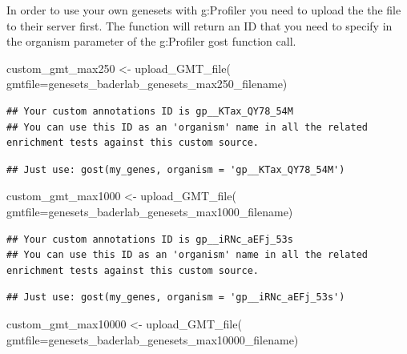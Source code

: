 \documentclass[
]{book}
\newenvironment{Shaded}{\begin{snugshade}}{\end{snugshade}}
\newcommand{\AttributeTok}[1]{\textcolor[rgb]{0.77,0.63,0.00}{#1}}
\newcommand{\FunctionTok}[1]{\textcolor[rgb]{0.00,0.00,0.00}{#1}}
\newcommand{\NormalTok}[1]{#1}
\newcommand{\OtherTok}[1]{\textcolor[rgb]{0.56,0.35,0.01}{#1}}
\begin{document}
In order to use your own genesets with g:Profiler you need to upload the the file to their server first. The function will return an ID that you need to specify in the organism parameter of the g:Profiler gost function call.

\begin{Shaded}
\begin{Highlighting}[]
\NormalTok{custom\_gmt\_max250 }\OtherTok{\textless{}{-}} \FunctionTok{upload\_GMT\_file}\NormalTok{(}
                        \AttributeTok{gmtfile=}\NormalTok{genesets\_baderlab\_genesets\_max250\_filename)}
\end{Highlighting}
\end{Shaded}

\begin{verbatim}
## Your custom annotations ID is gp__KTax_QY78_54M
## You can use this ID as an 'organism' name in all the related enrichment tests against this custom source.
\end{verbatim}

\begin{verbatim}
## Just use: gost(my_genes, organism = 'gp__KTax_QY78_54M')
\end{verbatim}

\begin{Shaded}
\begin{Highlighting}[]
\NormalTok{custom\_gmt\_max1000 }\OtherTok{\textless{}{-}} \FunctionTok{upload\_GMT\_file}\NormalTok{(}
                        \AttributeTok{gmtfile=}\NormalTok{genesets\_baderlab\_genesets\_max1000\_filename)}
\end{Highlighting}
\end{Shaded}

\begin{verbatim}
## Your custom annotations ID is gp__iRNc_aEFj_53s
## You can use this ID as an 'organism' name in all the related enrichment tests against this custom source.
\end{verbatim}

\begin{verbatim}
## Just use: gost(my_genes, organism = 'gp__iRNc_aEFj_53s')
\end{verbatim}

\begin{Shaded}
\begin{Highlighting}[]
\NormalTok{custom\_gmt\_max10000 }\OtherTok{\textless{}{-}} \FunctionTok{upload\_GMT\_file}\NormalTok{(}
                        \AttributeTok{gmtfile=}\NormalTok{genesets\_baderlab\_genesets\_max10000\_filename)}
\end{Highlighting}
\end{Shaded}
\end{document}
